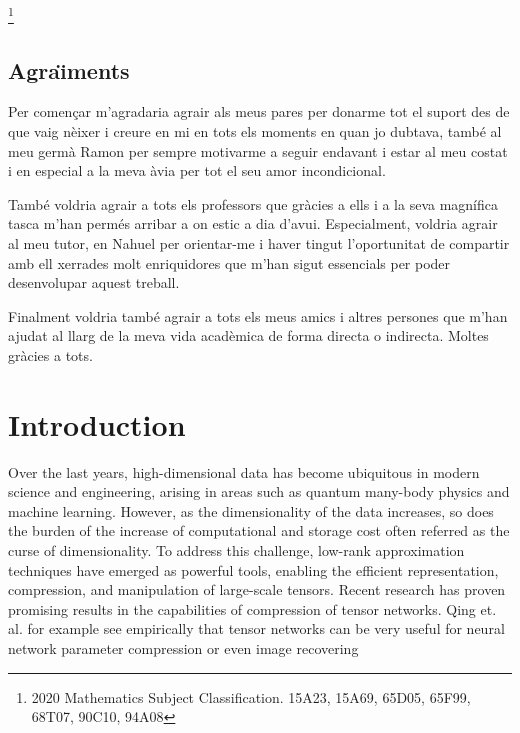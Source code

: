 \documentclass[11pt,a4paper,openright,oneside]{book}
\numberwithin{equation}{section}
\begin{document}
{\let\thefootnote\relax\footnote{2020 Mathematics Subject Classification. 15A23, 15A69, 65D05, 65F99, 68T07, 90C10, 94A08}}



\newpage 


\section*{Agra\"{\i}ments}

Per començar m'agradaria agrair als meus pares per donarme tot el suport des de que vaig nèixer i creure
en mi en tots els moments en quan jo dubtava, també
al meu germà Ramon per sempre motivarme a seguir endavant i estar al meu costat i en especial a la meva àvia per tot el seu amor incondicional.

També voldria agrair a tots els professors que gràcies a ells i a la seva magnífica tasca
m'han permés arribar a on estic a dia d'avui. Especialment, voldria agrair al meu tutor, en Nahuel per orientar-me i haver tingut l'oportunitat de compartir amb ell xerrades molt enriquidores que m'han sigut 
essencials per poder desenvolupar aquest treball.

Finalment voldria també agrair a tots els meus amics i altres persones que m'han ajudat al llarg de la meva
vida acadèmica de forma directa o indirecta. Moltes gràcies a tots.
\newpage

{\hypersetup{linkcolor=black}
\tableofcontents
}

\newpage
\printglossary[title=Glossary]
\newpage
{} 
\setcounter{page}{1}
\chapter{Introduction}


Over the last years, high-dimensional data has become ubiquitous in modern science and engineering,
arising in areas such as quantum many-body physics and machine learning. However, as the dimensionality of the
data increases, so does the burden of the increase of computational and storage cost often referred
as the curse of dimensionality. To address this challenge, low-rank approximation techniques have emerged as powerful tools,
enabling the efficient representation, compression, and manipulation of large-scale tensors. Recent research 
has proven promising results in the capabilities of compression of
tensor networks. Qing et. al. for example see empirically that tensor networks can be very useful
for neural network parameter compression \cite{qingCompressingNeuralNetworks2025} or even image
recovering \cite{lyuMultiDimensionalImageRecovery2022}
\end{document}

